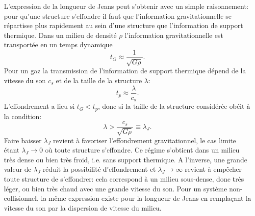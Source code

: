 L'expression de la longueur de Jeans peut s'obtenir avec un simple raisonnement: pour qu'une structure s'effondre il faut que l'information gravitationnelle se répartisse plus rapidement au sein d'une structure que l'information de support thermique. Dans un milieu de densité $\rho$ l'information gravitationnelle est transportée en un temps dynamique
\begin{equation}
t_G\approx \frac{1}{\sqrt{G\rho}}.
\end{equation}
Pour un gaz la transmission de l'information de support thermique dépend de la vitesse du son $c_s$ et de la taille de la structure $\lambda$:
\begin{equation}
t_p\approx\frac{\lambda}{c_s}.
\end{equation}
L'effondrement a lieu si $t_G<t_p$, donc si la taille de la structure considérée obéit à la condition:
\begin{equation}
\lambda >\frac{c_s}{\sqrt{G\rho}}\equiv \lambda_J.
\end{equation}
Faire baisser $\lambda_J$ revient à favoriser l'effondrement gravitationnel, le cas limite étant $\lambda_J \rightarrow 0$ où toute structure s'effondre. Ce régime s'obtient dans un milieu très dense ou bien très froid, i.e. sans support thermique.  A l'inverse, une grande valeur de $\lambda_J$ réduit la possibilité d'effondrement et $\lambda_J\rightarrow\infty$ revient à empêcher toute structure de s'effondrer: cela correspond à un milieu sous-dense, donc très léger, ou bien très chaud avec une grande vitesse du son. Pour un système non-collisionnel, la même expression existe pour la longueur de Jeans en remplaçant la vitesse du son par la dispersion de vitesse du milieu.

